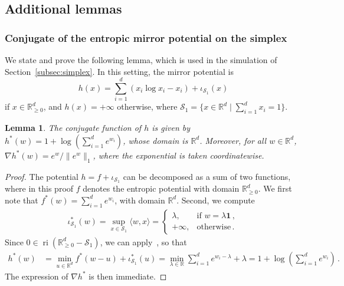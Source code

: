 \documentclass[11pt,english,reqno]{article}
\DeclareMathOperator{\ri}{ri}
\newcommand{\R}{\mathbb{R}}
\renewcommand{\geq}{\geqslant}
\theoremstyle{plain}
\newtheorem{lem}[proposition]{Lemma}
\theoremstyle{definition}
\theoremstyle{remark}
\numberwithin{equation}{section}
\begin{document}
\clearpage

\subsection{Additional lemmas}

\subsubsection{Conjugate of the entropic mirror potential on the simplex}

We state and prove the following lemma, which is used in the simulation of Section~\ref{subsec:simplex}. In this setting, the mirror potential is
\[
	h(x) = \sum_{i=1}^d (x_i \log x_i - x_i) + \iota_{\mathcal{S}_1}(x)
\]
if $x \in \R^d_{\geq 0}$, and $h(x) = +\infty$ otherwise, where $\mathcal{S}_1 = \{x \in \R^d \mid \sum_{i=1}^d x_i = 1\}$.
%
\begin{lem}
	\label{lem:mirror-potential-simplex}
	The conjugate function of $h$ is given by $\displaystyle h^*(w) = 1 + \log \left(\sum_{i=1}^d e^{w_i}\right)$, whose domain is $\R^d$. Moreover, for all $w \in \R^d$, $\displaystyle\nabla h^*(w) = e^{w}/\|e^w\|_1$, where the exponential is taken coordinatewise.
\end{lem}
%
\begin{proof}
	The potential $h = f + \iota_{\mathcal{S}_1}$ can be decomposed as a sum of two functions, where in this proof $f$ denotes the entropic potential with domain $\R^d_{\geq 0}$. We first note that $f^*(w) = \sum_{i=1}^d e^{w_i}$, with domain $\R^d$. Second, we compute
	\begin{align*}
	\iota_{\mathcal{S}_1}^*(w) = \sup_{x \in \mathcal{S}_1} \langle w, x\rangle = 
	\begin{cases}
		\lambda, & \text{if } w  =  \lambda \mathbf{1} \, , \\
		+\infty, & \text{otherwise} \, .
	\end{cases}
	\end{align*}
	Since $0 \in \ri(\R^d_{\geq 0} - \mathcal{S}_1)$, we can apply~\cite[Theorem 15.3]{bauschke2017convex}, so that
	\begin{align*}
	h^*(w) &= \min_{u \in \R^d} f^*(w-u) + \iota_{\mathcal{S}_1}^*(u) = \min_{\lambda \in \R} \sum_{i=1}^d e^{w_i - \lambda} + \lambda = 1 + \log \left(\sum_{i=1}^d e^{w_i}\right) \, .
	\end{align*}
	The expression of $\nabla h^*$ is then immediate.
\end{proof}
\end{document}
